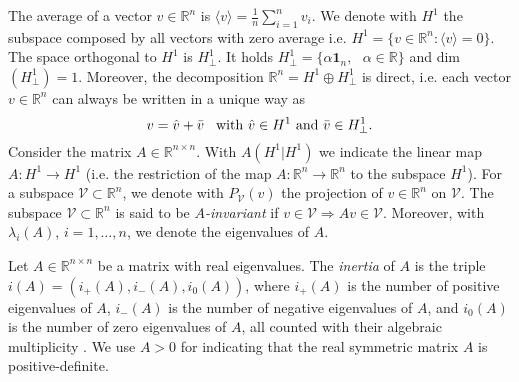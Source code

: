 \documentclass[a4paper]{article}
\theoremstyle{plain}
\begin{document}
The average of a vector $v\in\mathbb{R}^n$ is $\langle v\rangle=\frac{1}{n}\sum_{i=1}^n v_i$. We denote with $H^1$ the subspace composed by all vectors with zero average \cite{bensoussan2005difference,1643380} i.e. $H^1 = \{v\in\mathbb{R}^n:\langle v\rangle = 0\}$. The space orthogonal to $H^1$ is $H_{\perp}^1$. It holds $H_{\perp}^1 =\{\alpha\mathbf{1}_n,\text{ }\alpha\in\mathbb{R}\}$ and dim$(H_{\perp}^1)=1$. Moreover, the decomposition $\mathbb{R}^n = H^1\oplus H_{\perp}^1$ is direct, i.e. each vector $v\in\mathbb{R}^n$ can always be written in a unique way as
\begin{equation}
\label{eq:decomposition}
v = \hat v + \bar v \hspace{3mm}\text{with }\hat v\in H^1\text{ and }\bar v\in H^1_{\perp}.
\end{equation}
Consider the matrix $A\in\mathbb{R}^{n\times n}$. With
$A(H^1|H^1)$ we indicate the linear map $A:H^1\rightarrow H^1$
(i.e. the restriction of the map
$A:\mathbb{R}^n\rightarrow\mathbb{R}^n$ to the subspace $H^1$). For a
subspace $\mathcal{V}\subset\mathbb{R}^n$, we denote with
$P_{\mathcal{V}}(v)$ the projection of $v\in\mathbb{R}^n$ on
$\mathcal{V}$. The subspace $\mathcal{V}\subset\mathbb{R}^n$ is said to be
$A$\textit{-invariant} if $v\in\mathcal{V}\Rightarrow A v\in\mathcal{V}$. Moreover, with $\lambda_i(A)$, $i=1, \dots, n$, we denote the eigenvalues of $A$.

Let $A\in\mathbb{R}^{n\times n}$ be a matrix with real eigenvalues. The \textit{inertia} of $A$ is the triple $i(A) = (i_{+}(A), i_{-}(A), i_{0}(A))$, where $i_{+}(A)$ is the number of positive eigenvalues of $A$,  $i_{-}(A)$ is the number of negative eigenvalues of $A$, and  $i_{0}(A)$ is the number of zero eigenvalues of $A$, all counted with their algebraic multiplicity \cite{hong1991jordan}. We use $A>0$ for indicating that the real symmetric matrix $A$ is positive-definite.
\end{document}
